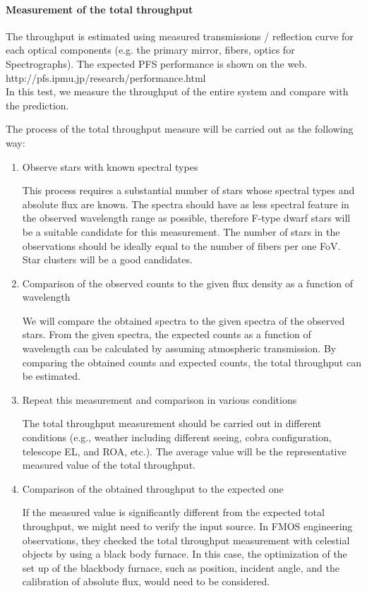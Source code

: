 \paragraph{Measurement of the total throughput}
The throughput is estimated using measured transmissions / reflection curve for each optical components (e.g. the primary mirror, fibers, optics for Spectrographs).
The expected PFS performance is shown on the web.\\
\hspace*{10mm} http://pfs.ipmu.jp/research/performance.html \\
In this test, we measure the throughput of the entire system and compare with the prediction.

The process of the total throughput measure will be carried out as the following way:

\begin{enumerate}
\item{Observe stars with known spectral types}

This process requires a substantial number of stars whose spectral types and absolute flux are known. The spectra should have as less spectral feature in the observed wavelength range as possible, therefore F-type dwarf stars will be a suitable candidate for this measurement. The number of stars in the observations should be ideally equal to the number of fibers per one FoV. Star clusters will be a good candidates.

\item{Comparison of the observed counts to the given flux density as a function of wavelength}

We will compare the obtained spectra to the given spectra of the observed stars. From the given spectra, the expected counts as a function of wavelength can be calculated by assuming atmospheric transmission. By comparing the obtained counts and expected counts, the total throughput can be estimated.

\item{Repeat this measurement and comparison in various conditions}

The total throughput measurement should be carried out in different conditions (e.g., weather including different seeing, cobra configuration, telescope EL, and ROA, etc.). The average value will be the representative measured value of the total throughput. 

\item{Comparison of the obtained throughput to the expected one}

If the measured value is significantly different from the expected total throughput, we might need to verify the input source. In FMOS engineering observations, they checked the total throughput measurement with celestial objects by using a black body furnace. In this case, the optimization of the set up of the blackbody furnace, such as position, incident angle, and the calibration of absolute flux, would need to be considered.

\end{enumerate}

